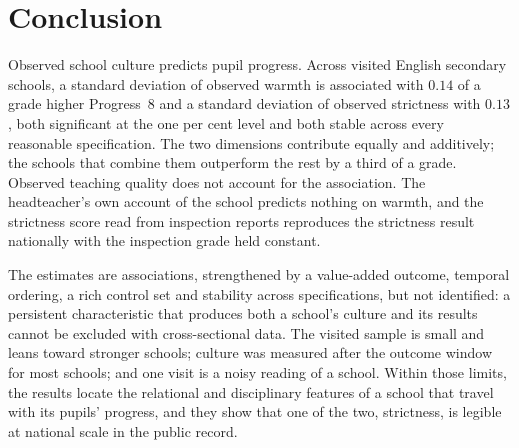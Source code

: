 \section{Conclusion}
\label{sec:p2_conclusion}

Observed school culture predicts pupil progress. Across \NTierOne{} visited
English secondary schools, a standard deviation of observed warmth is
associated with $0.14$ of a grade higher Progress~8 and a standard deviation
of observed strictness with $0.13$, both significant at the one per cent
level and both stable across every reasonable specification. The two
dimensions contribute equally and additively; the schools that combine them
outperform the rest by a third of a grade. Observed teaching quality does not
account for the association. The headteacher's own account of the school
predicts nothing on warmth, and the strictness score read from inspection
reports reproduces the strictness result nationally with the inspection grade
held constant.

The estimates are associations, strengthened by a value-added outcome,
temporal ordering, a rich control set and stability across specifications, but
not identified: a persistent characteristic that produces both a school's
culture and its results cannot be excluded with cross-sectional data. The
visited sample is small and leans toward stronger schools; culture was
measured after the outcome window for most schools; and one visit is a noisy
reading of a school. Within those limits, the results locate the relational
and disciplinary features of a school that travel with its pupils' progress,
and they show that one of the two, strictness, is legible at national scale
in the public record.
